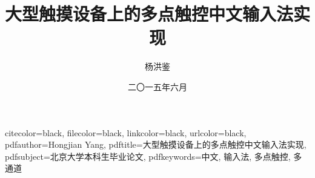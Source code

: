 \documentclass[UTF8,hyperref]{pkuthss}
\begin{document}
  \hypersetup
  {
    citecolor=black,
    filecolor=black,
    linkcolor=black,
    urlcolor=black,
    pdfauthor={Hongjian Yang},
    pdftitle={大型触摸设备上的多点触控中文输入法实现},
    pdfsubject={北京大学本科生毕业论文},
    pdfkeywords={中文, 输入法, 多点触控, 多通道}
  }

  \renewcommand{\thesisname}{本科生毕业论文}
  \title{大型触摸设备上的多点触控中文输入法实现}
  \author{杨洪鉴}
  \date{二〇一五年六月}

  \frontmatter{}
  
  \maketitle
  

  \cleardoublepage
  \tableofcontents

  \mainmatter{}

  
  
  
  
  
  

  \begin{appendix}
    

    
    
  \end{appendix}

  \backmatter{}

  
  \cleardoublepage\pagestyle{empty}
  
\end{document}
